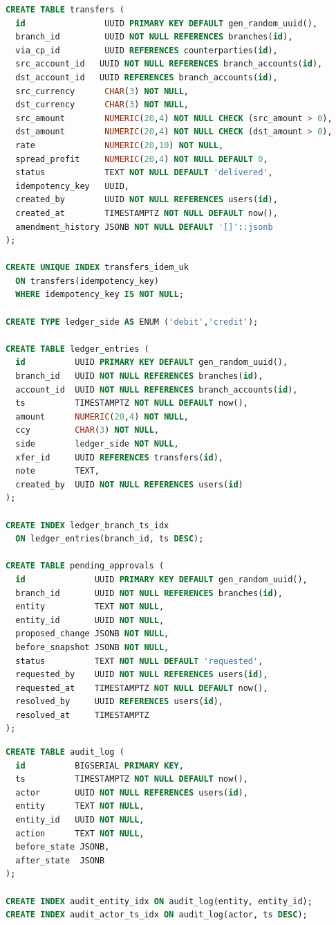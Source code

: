 \begin{lstlisting}[language=SQL,caption={Transfers, ledger entries and approvals},label={lst:transfers-ddl}]
CREATE TABLE transfers (
  id                UUID PRIMARY KEY DEFAULT gen_random_uuid(),
  branch_id         UUID NOT NULL REFERENCES branches(id),
  via_cp_id         UUID REFERENCES counterparties(id),
  src_account_id   UUID NOT NULL REFERENCES branch_accounts(id),
  dst_account_id   UUID REFERENCES branch_accounts(id),
  src_currency      CHAR(3) NOT NULL,
  dst_currency      CHAR(3) NOT NULL,
  src_amount        NUMERIC(20,4) NOT NULL CHECK (src_amount > 0),
  dst_amount        NUMERIC(20,4) NOT NULL CHECK (dst_amount > 0),
  rate              NUMERIC(20,10) NOT NULL,
  spread_profit     NUMERIC(20,4) NOT NULL DEFAULT 0,
  status            TEXT NOT NULL DEFAULT 'delivered',
  idempotency_key   UUID,
  created_by        UUID NOT NULL REFERENCES users(id),
  created_at        TIMESTAMPTZ NOT NULL DEFAULT now(),
  amendment_history JSONB NOT NULL DEFAULT '[]'::jsonb
);

CREATE UNIQUE INDEX transfers_idem_uk
  ON transfers(idempotency_key)
  WHERE idempotency_key IS NOT NULL;

CREATE TYPE ledger_side AS ENUM ('debit','credit');

CREATE TABLE ledger_entries (
  id          UUID PRIMARY KEY DEFAULT gen_random_uuid(),
  branch_id   UUID NOT NULL REFERENCES branches(id),
  account_id  UUID NOT NULL REFERENCES branch_accounts(id),
  ts          TIMESTAMPTZ NOT NULL DEFAULT now(),
  amount      NUMERIC(20,4) NOT NULL,
  ccy         CHAR(3) NOT NULL,
  side        ledger_side NOT NULL,
  xfer_id     UUID REFERENCES transfers(id),
  note        TEXT,
  created_by  UUID NOT NULL REFERENCES users(id)
);

CREATE INDEX ledger_branch_ts_idx
  ON ledger_entries(branch_id, ts DESC);

CREATE TABLE pending_approvals (
  id              UUID PRIMARY KEY DEFAULT gen_random_uuid(),
  branch_id       UUID NOT NULL REFERENCES branches(id),
  entity          TEXT NOT NULL,
  entity_id       UUID NOT NULL,
  proposed_change JSONB NOT NULL,
  before_snapshot JSONB NOT NULL,
  status          TEXT NOT NULL DEFAULT 'requested',
  requested_by    UUID NOT NULL REFERENCES users(id),
  requested_at    TIMESTAMPTZ NOT NULL DEFAULT now(),
  resolved_by     UUID REFERENCES users(id),
  resolved_at     TIMESTAMPTZ
);
\end{lstlisting}

\begin{lstlisting}[language=SQL,caption={Audit log},label={lst:audit-ddl}]
CREATE TABLE audit_log (
  id          BIGSERIAL PRIMARY KEY,
  ts          TIMESTAMPTZ NOT NULL DEFAULT now(),
  actor       UUID NOT NULL REFERENCES users(id),
  entity      TEXT NOT NULL,
  entity_id   UUID NOT NULL,
  action      TEXT NOT NULL,
  before_state JSONB,
  after_state  JSONB
);

CREATE INDEX audit_entity_idx ON audit_log(entity, entity_id);
CREATE INDEX audit_actor_ts_idx ON audit_log(actor, ts DESC);
\end{lstlisting}
